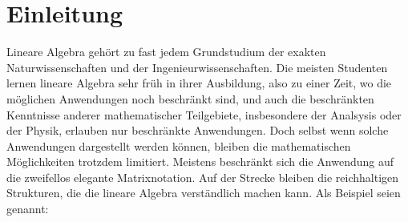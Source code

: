 %
%
%
\chapter*{Einleitung}
\rhead{}
Lineare Algebra gehört zu fast jedem Grundstudium der exakten
Naturwissenschaften und der Ingenieurwissenschaften.
Die meisten Studenten lernen lineare Algebra sehr früh in ihrer Ausbildung,
also zu einer Zeit, wo die möglichen Anwendungen noch beschränkt sind,
und auch die beschränkten Kenntnisse anderer mathematischer Teilgebiete,
insbesondere der Analsysis oder der Physik, erlauben nur beschränkte 
Anwendungen.
Doch selbst wenn solche Anwendungen dargestellt werden können, bleiben
die mathematischen Möglichkeiten trotzdem limitiert.
Meistens beschränkt sich die Anwendung auf die zweifellos elegante 
Matrixnotation.
Auf der Strecke bleiben die reichhaltigen Strukturen, die die
lineare Algebra verständlich machen kann.
Als Beispiel seien genannt:
